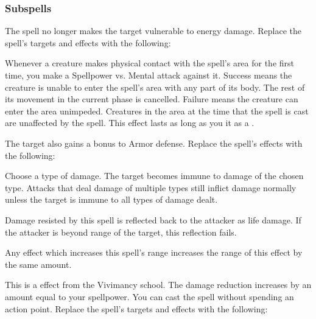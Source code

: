 \subsubsection{Subspells}
The spell no longer makes the target vulnerable to energy damage.
Replace the spell's targets and effects with the following:
\begin{spellcontent}
\begin{augmenttargetinginfo}
\end{augmenttargetinginfo}
\begin{augmenteffects}
\spelleffect
Whenever a creature makes physical contact with the spell's area for the first time, you make a Spellpower vs. Mental attack against it.
Success means the creature is unable to enter the spell's area with any part of its body.
The rest of its movement in the current phase is cancelled.
Failure means the creature can enter the area unimpeded.
Creatures in the area at the time that the spell is cast are unaffected by the spell.
This effect lasts as long as you  it as a .
\end{augmenteffects}
\end{spellcontent}
The target also gains a  bonus to Armor defense.
Replace the spell's effects with the following:
\begin{spellcontent}
\begin{augmenteffects}
\spelleffect
Choose a type of damage.
The target becomes immune to damage of the chosen type.
Attacks that deal damage of multiple types still inflict damage normally unless the target is immune to all types of damage dealt.
\end{augmenteffects}
\end{spellcontent}
Damage resisted by this spell is reflected back to the attacker as life damage.
If the attacker is beyond \rngclose range of the target, this reflection fails.
\par Any effect which increases this spell's range increases the range of this effect by the same amount.
\par
This is a  effect from the Vivimancy school.
The damage reduction increases by an amount equal to your spellpower.
You can cast the spell without spending an action point.
Replace the spell's targets and effects with the following:
